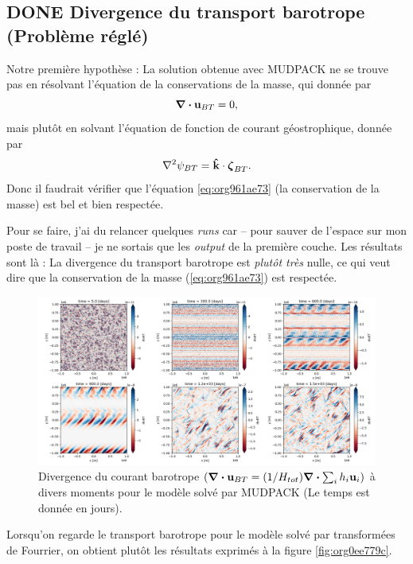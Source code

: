\documentclass[10pt]{article}
\numberwithin{equation}{section}
\newcommand{\kvf}{\vb{\hat{k}}}
\newcommand{\uu}{\vb{u}}
\begin{document}
\subsection{{\bfseries\sffamily DONE} Divergence du transport barotrope (Problème réglé)}
\label{sec:orged41ac1}
Notre première hypothèse : La solution obtenue avec MUDPACK ne se trouve pas en résolvant l'équation de la conservations de la masse, qui donnée par
\begin{equation}
\label{eq:org961ae73}
   \div{\uu_{BT}} = 0,
\end{equation}
mais plutôt en solvant l'équation de fonction de courant géostrophique, donnée par
\begin{equation}
   \laplacian{\psi_{BT}} = \kvf \cdot \boldsymbol{\zeta}_{BT}.
\end{equation}
Donc il faudrait vérifier que l'équation \ref{eq:org961ae73} (la conservation de la masse) est bel et bien respectée.\bigskip

Pour se faire, j'ai du relancer quelques \emph{runs} car -- pour sauver de l'espace sur mon poste de travail -- je ne sortais que les \emph{output} de la première couche.
Les résultats sont là :
La divergence du transport barotrope est \emph{plutôt très} nulle, ce qui veut dire que la conservation de la masse (\ref{eq:org961ae73}) est respectée.

\begin{figure}[!htpb]
\centering
\includegraphics[width=.9\linewidth]{figures/debuggage/2023_06_21divBT1_MUD.png}
\caption{\label{fig:org1073ef8}Divergence du courant barotrope \(\qty(\div{\uu_{BT}} = \qty(1/H_{tot}) \div{\sum_i h_i \uu_i})\) à divers moments pour le modèle solvé par MUDPACK (Le temps est donnée en jours).}
\end{figure}

Lorsqu'on regarde le transport barotrope pour le modèle solvé par transformées de Fourrier, on obtient plutôt les résultats exprimés à la figure \ref{fig:org0ee779c}. 
\end{document}
